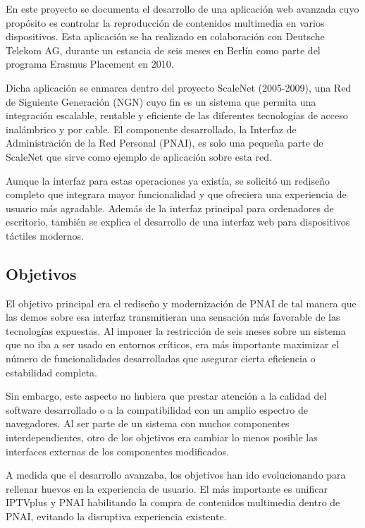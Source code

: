 En este proyecto se documenta el desarrollo de una aplicación web avanzada cuyo propósito es controlar la reproducción de contenidos multimedia en varios dispositivos. Esta aplicación se ha realizado en colaboración con Deutsche Telekom AG, durante un estancia de seis meses en Berlín como parte del programa Erasmus Placement en 2010.

Dicha aplicación se enmarca dentro del proyecto ScaleNet (2005-2009), una Red de Siguiente Generación (NGN) cuyo fin es un sistema que permita una integración escalable, rentable y eficiente de las diferentes tecnologías de acceso inalámbrico y por cable. El componente desarrollado, la Interfaz de Administración de la Red Personal (PNAI), es solo una pequeña parte de ScaleNet que sirve como ejemplo de aplicación sobre esta red.

Aunque la interfaz para estas operaciones ya existía, se solicitó un rediseño completo que integrara mayor funcionalidad y que ofreciera una experiencia de usuario más agradable. Además de la interfaz principal para ordenadores de escritorio, también se explica el desarrollo de una interfaz web para dispositivos táctiles modernos.

\subsection{Objetivos} %
\label{sub:objetivos}

El objetivo principal era el rediseño y modernización de PNAI de tal manera que las demos sobre esa interfaz transmitieran una sensación más favorable de las tecnologías expuestas.
Al imponer la restricción de seis meses sobre un sistema que no iba a ser usado en entornos críticos, era más importante maximizar el número de funcionalidades desarrolladas que asegurar cierta eficiencia o estabilidad completa.

Sin embargo, este aspecto no hubiera que prestar atención a la calidad del software desarrollado o a la compatibilidad con un amplio espectro de navegadores.
Al ser parte de un sistema con muchos componentes interdependientes, otro de los objetivos era cambiar lo menos posible las interfaces externas de los componentes modificados.

A medida que el desarrollo avanzaba, los objetivos han ido evolucionando para rellenar huevos en la experiencia de usuario.
El más importante es unificar IPTVplus y PNAI habilitando la compra de contenidos multimedia dentro de PNAI, evitando la disruptiva experiencia existente.

